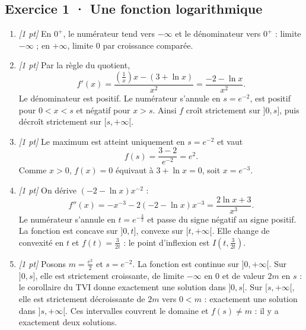 \subsection*{Exercice 1 · Une fonction logarithmique}\begin{enumerate}

\item \textit{[1 pt]} En $0^+$, le numérateur tend vers $-\infty$ et le dénominateur vers $0^+$ : limite $-\infty$ ; en $+\infty$, limite $0$ par croissance comparée.

\item \textit{[1 pt]} Par la règle du quotient,
\[f'(x)=\frac{(\frac{1}{x})x-(3+\ln x)}{x^2}=\frac{-2-\ln x}{x^2}.\]
Le dénominateur est positif. Le numérateur s'annule en $s=e^{-2}$, est positif pour $0<x<s$ et négatif pour $x>s$. Ainsi $f$ croît strictement sur $]0,s]$, puis décroît strictement sur $[s,+\infty[$.

\item \textit{[1 pt]} Le maximum est atteint uniquement en $s=e^{-2}$ et vaut
\[f(s)=\frac{3- 2}{e^{-2}}=e^{2}.\]
Comme $x>0$, $f(x)=0$ équivaut à $3+\ln x=0$, soit $x=e^{-3}$.

\item \textit{[1 pt]} On dérive $(-2-\ln x)x^{-2}$ :
\[f''(x)=-x^{-3}-2(-2-\ln x)x^{-3}=\frac{2\ln x+3}{x^3}.\]
Le numérateur s'annule en $t=e^{-\frac{3}{2}}$ et passe du signe négatif au signe positif. La fonction est concave sur $]0,t]$, convexe sur $[t,+\infty[$. Elle change de convexité en $t$ et $f(t)=\frac{3}{2t}$ : le point d'inflexion est $I(t,\frac{3}{2t})$.

\item \textit{[1 pt]} Posons $m=\frac{e^{2}}{2}$ et $s=e^{-2}$. La fonction est continue sur $]0,+\infty[$. Sur $]0,s]$, elle est strictement croissante, de limite $-\infty$ en $0$ et de valeur $2m$ en $s$ : le corollaire du TVI donne exactement une solution dans $]0,s[$. Sur $[s,+\infty[$, elle est strictement décroissante de $2m$ vers $0<m$ : exactement une solution dans $]s,+\infty[$. Ces intervalles couvrent le domaine et $f(s)\ne m$ : il y a exactement deux solutions.

\end{enumerate}

